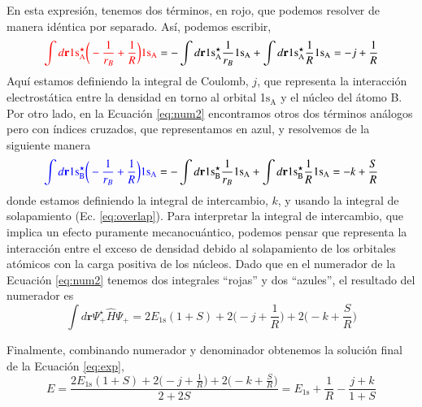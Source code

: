 \documentclass[notitlepage, amsmath,amssymb,
 aps,12pt,tightenlines]{revtex4-1}
\begin{document}
En esta expresión, tenemos dos términos,
en rojo, que podemos resolver de manera 
idéntica por separado. Así, podemos escribir,
\begin{equation}
    {\color{red}\int d\mathbf{r} 1\mathrm{s^\star_A} \bigg(-\frac{1}{r_B}+\frac{1}{R}\bigg) 1\mathrm{s_A}} = 
    -\int d\mathbf{r} 1\mathrm{s^\star_A} \frac{1}{r_B}1\mathrm{s_A}
    +
    \int d\mathbf{r} 1\mathrm{s^\star_A} \frac{1}{R}1\mathrm{s_A}= -j+\frac{1}{R}
\end{equation}
Aquí estamos definiendo la integral de Coulomb,
$j$, que representa la interacción
electrostática entre la densidad en torno 
al orbital 1$\mathrm{s_A}$ y el núcleo del
átomo B. 
Por otro lado, en la Ecuación \ref{eq:num2}
encontramos otros dos términos análogos pero con índices
cruzados, que representamos en azul, y resolvemos de la
siguiente manera
\begin{equation}
    {\color{blue}\int d\mathbf{r} 1\mathrm{s^\star_B} \bigg(-\frac{1}{r_B}+\frac{1}{R}\bigg) 1\mathrm{s_A}} = 
    -\int d\mathbf{r} 1\mathrm{s^\star_B} \frac{1}{r_B}1\mathrm{s_A}
    +
    \int d\mathbf{r} 1\mathrm{s^\star_B} \frac{1}{R}1\mathrm{s_A}= -k+\frac{S}{R}
\end{equation}
donde estamos definiendo la integral de intercambio, $k$, 
y usando la integral de solapamiento (Ec. \ref{eq:overlap}).
Para interpretar la integral de intercambio, que implica
un efecto puramente mecanocuántico, podemos pensar que 
representa la interacción entre el exceso de densidad 
debido al solapamiento de los orbitales atómicos con 
la carga positiva de los núcleos.
Dado que en el numerador de la Ecuación \ref{eq:num2}
 tenemos dos integrales ``rojas'' y dos ``azules'', 
 el resultado del numerador  es
\begin{equation}
    \int d\mathbf{r}\Psi_+^\star\hat{H}\Psi_+=
2E_\mathrm{1s}(1 + S) + 2\bigg(-j+\frac{1}{R}\bigg) + 2\bigg( -k+\frac{S}{R}\bigg)
\end{equation}

Finalmente, combinando numerador y denominador obtenemos la
solución final de la Ecuación \ref{eq:exp},
\begin{equation}
    E = \frac{2E_\mathrm{1s}(1 + S) + 2\bigg(-j+\frac{1}{R}\bigg) + 2\bigg( -k+\frac{S}{R}\bigg)}{2 + 2S} = 
    E_\mathrm{1s} + \frac{1}{R} - \frac{j+k}{1+S}
\end{equation}
\end{document}
